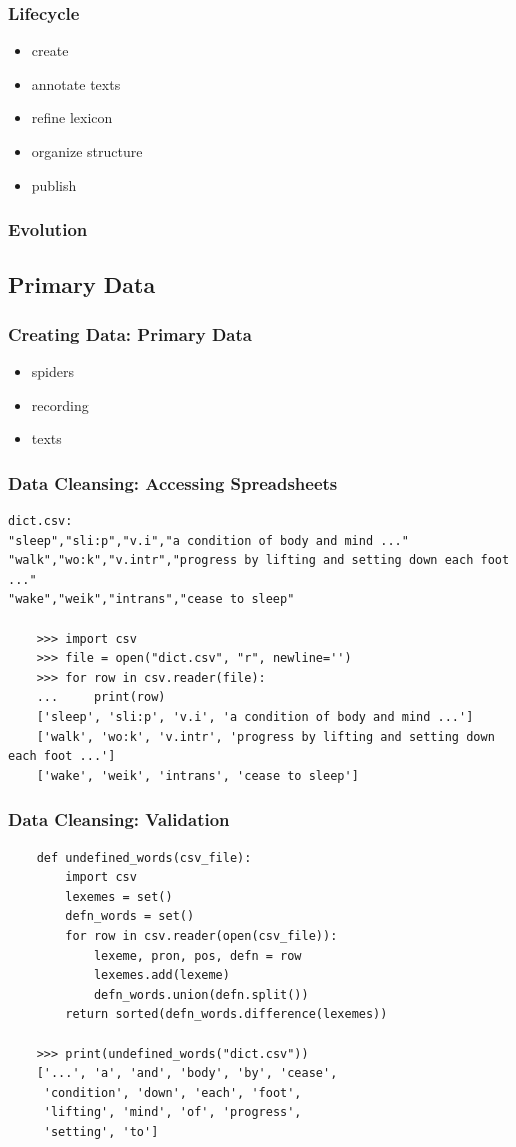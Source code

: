 \documentclass{beamer}             %
\begin{document}
\begin{frame}
\frametitle{Lifecycle}

\begin{itemize}
\item create
\item annotate texts
\item refine lexicon
\item organize structure
\item publish
\end{itemize}
\end{frame}

\begin{frame}
\frametitle{Evolution}
\end{frame}

\subsection{Primary Data}

\begin{frame}
\frametitle{Creating Data: Primary Data}

\begin{itemize}
\item spiders
\item recording
\item texts
\end{itemize}
\end{frame}

\begin{frame}[fragile]
\frametitle{Data Cleansing: Accessing Spreadsheets}
\scriptsize
\begin{verbatim}
dict.csv:
"sleep","sli:p","v.i","a condition of body and mind ..."
"walk","wo:k","v.intr","progress by lifting and setting down each foot ..."
"wake","weik","intrans","cease to sleep"

    >>> import csv
    >>> file = open("dict.csv", "r", newline='')
    >>> for row in csv.reader(file):
    ...     print(row)
    ['sleep', 'sli:p', 'v.i', 'a condition of body and mind ...']
    ['walk', 'wo:k', 'v.intr', 'progress by lifting and setting down each foot ...']
    ['wake', 'weik', 'intrans', 'cease to sleep']
\end{verbatim}
\end{frame}

\begin{frame}[fragile]
\frametitle{Data Cleansing: Validation}
\small
\begin{verbatim}
    def undefined_words(csv_file):
        import csv
        lexemes = set()
        defn_words = set()
        for row in csv.reader(open(csv_file)):
            lexeme, pron, pos, defn = row
            lexemes.add(lexeme)
            defn_words.union(defn.split())
        return sorted(defn_words.difference(lexemes))
        
    >>> print(undefined_words("dict.csv"))
    ['...', 'a', 'and', 'body', 'by', 'cease',
     'condition', 'down', 'each', 'foot',
     'lifting', 'mind', 'of', 'progress',
     'setting', 'to']
\end{verbatim}
\end{frame}
\end{document}
